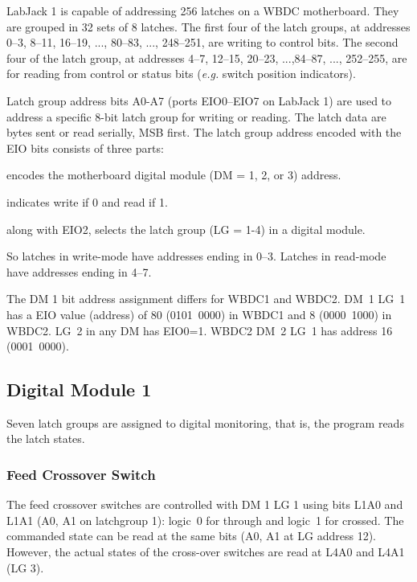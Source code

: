 \documentclass[letterpaper,11pt]{book}
\begin{document}
LabJack 1 is capable of addressing 256 latches on a WBDC motherboard.
They are grouped in 32 sets of 8 latches. The first four of the latch groups,
at addresses 0--3, 8--11, 16--19, ..., 80--83, ..., 248--251,
are writing to control bits. The second four of the latch group,
at addresses 4--7, 12--15, 20--23, ...,84--87, ..., 252--255,
are for reading from control or status bits ({\it e.g.} switch position 
indicators).

Latch group address bits A0-A7 (ports EIO0--EIO7 on LabJack 1) are used to 
address a specific 8-bit latch group for writing or reading. The latch data are
bytes sent or read serially, MSB first.  The latch group address encoded with 
the EIO bits consists of three parts:
\begin{description}\itemsep0pt \parskip0pt 
  \item[EIO7-EIO3]  encodes the motherboard digital module (DM = 1, 2, or 3) 
  address.
  \item[EIO2] indicates write if 0 and read if 1.
  \item[EIO1-EIO0] along with EIO2, selects the latch group (LG = 1-4) in a 
  digital  module.
\end{description}
So latches in write-mode have addresses ending in 0--3.  Latches in read-mode
have addresses ending in 4--7. 

The DM 1 bit address assignment differs for 
WBDC1 and WBDC2. DM~1 LG~1 has a EIO value (address) of 80 (0101~0000) in WBDC1
and 8 (0000~1000) in WBDC2. LG~2 in any DM has EIO0=1.   WBDC2 DM~2 LG~1 has 
address 16 (0001~0000).



\subsection{Digital Module 1}\label{subsec:DM1}

Seven latch groups are assigned to digital monitoring, that is, the program
reads the latch states.

\subsubsection{Feed Crossover Switch}

The feed crossover switches are controlled with DM 1 LG 1 using bits L1A0 and
L1A1 (A0, A1 on latchgroup 1): logic~0 for through and logic~1 for 
crossed. The commanded state can be read at the same bits (A0, A1 at LG address
12). However, the actual states of the cross-over switches are read at L4A0 and
L4A1 (LG 3).
\end{document}
